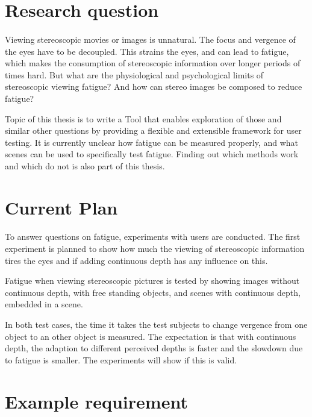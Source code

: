 \documentclass[11pt]{scrartcl}
\begin{document}
\begin{multicols}{2}


\section{Research question}
\paragraph{}
Viewing stereoscopic movies or images is unnatural. The focus and vergence of the eyes have to be decoupled. This strains the eyes, and can lead to fatigue, which makes the consumption of stereoscopic information over longer periods of times hard. But what are the physiological and psychological limits of stereoscopic viewing fatigue? And how can stereo images be composed to reduce fatigue?

Topic of this thesis is to write a Tool that enables exploration of those and similar other questions by providing a flexible and extensible framework for user testing. It is currently unclear how fatigue can be measured properly, and what scenes can be used to specifically test fatigue. Finding out which methods work and which do not is also part of this thesis.

\section{Current Plan}
\paragraph{}
To answer questions on fatigue, experiments with users are conducted. The first experiment is planned to show how much the viewing of stereoscopic information tires the eyes and if adding continuous depth has any influence on this.

Fatigue when viewing stereoscopic pictures is tested by showing images without continuous depth, with free standing objects, and scenes with continuous depth, embedded in a scene.

In both test cases, the time it takes the test subjects to change vergence from one object to an other object is measured. The expectation is that with continuous depth, the adaption to different perceived depths is faster and the slowdown due to fatigue is smaller. The experiments will show if this is valid.

\section{Example requirement}

\end{multicols}
\end{document}
